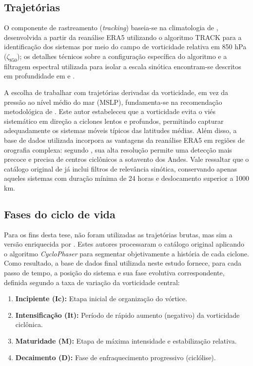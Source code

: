 \subsection{Trajetórias}\label{subsec:origen_tracking}
O componente de rastreamento (\textit{tracking}) baseia-se na climatologia de \citet{gramcianinov2019properties}, desenvolvida a partir da reanálise ERA5 utilizando o algoritmo TRACK para a identificação dos sistemas por meio do campo de vorticidade relativa em 850 hPa ($\zeta_{850}$); os detalhes técnicos sobre a configuração específica do algoritmo e a filtragem espectral utilizada para isolar a escala sinótica encontram-se descritos em profundidade em \citet{gramcianinov2019properties} e \citet{hoskins2005new}.

A escolha de trabalhar com trajetórias derivadas da vorticidade, em vez da pressão ao nível médio do mar (MSLP), fundamenta-se na recomendação metodológica de \citet{sinclair1994objective}. Este autor estabeleceu que a vorticidade evita o viés sistemático em direção a ciclones lentos e profundos, permitindo capturar adequadamente os sistemas móveis típicos das latitudes médias. Além disso, a base de dados utilizada incorpora as vantagens da reanálise ERA5 em regiões de orografia complexa: segundo \citet{gramcianinov2020analysis}, sua alta resolução permite uma detecção mais precoce e precisa de centros ciclônicos a sotavento dos Andes. Vale ressaltar que o catálogo original de \citet{gramcianinov2019properties} já inclui filtros de relevância sinótica, conservando apenas aqueles sistemas com duração mínima de 24 horas e deslocamento superior a 1000 km.

\subsection{Fases do ciclo de vida}\label{subsec:bd_enriquecida}
Para os fins desta tese, não foram utilizadas as trajetórias brutas, mas sim a versão enriquecida por \citet{coutodesouza2024new}. Estes autores processaram o catálogo original aplicando o algoritmo \textit{CycloPhaser} \citep{deSouza2025CycloPhaser} para segmentar objetivamente a história de cada ciclone. Como resultado, a base de dados final utilizada neste estudo fornece, para cada passo de tempo, a posição do sistema e sua fase evolutiva correspondente, definida segundo a taxa de variação da vorticidade central:

\begin{enumerate}
    \item \textbf{Incipiente (Ic):} Etapa inicial de organização do vórtice.
    \item \textbf{Intensificação (It):} Período de rápido aumento (negativo) da vorticidade ciclônica.
    \item \textbf{Maturidade (M):} Etapa de máxima intensidade e estabilização relativa.
    \item \textbf{Decaimento (D):} Fase de enfraquecimento progressivo (ciclólise).
\end{enumerate}

